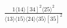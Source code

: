 \documentclass[varwidth, border=5pt]{standalone}
\begin{document}
\begin{my}
$\begin{gathered}
\scriptscriptstyle\frac{1⟨14⟩[34]^2⟨25⟩^2}{⟨13⟩⟨15⟩⟨24⟩⟨35⟩[35]^2}
\end{gathered}$
\end{my}
\end{document}
